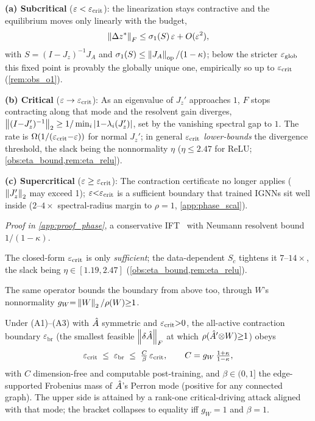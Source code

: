 \begin{theorem}
\noindent\textbf{(a) Subcritical} ($\varepsilon<\varepsilon_{\mathrm{crit}}$): the linearization stays contractive and the equilibrium moves only linearly with the budget,
\begin{equation}
\left\|\Delta z^{*}\right\|_F \leq \sigma_1(S)\,\varepsilon + O(\varepsilon^2),
\label{eq:shift_bound}
\end{equation}
with $S=(I-J_z)^{-1}J_A$ and $\sigma_1(S)\le\left\|J_A\right\|_{\mathrm{op}}/(1-\kappa)$; below the stricter $\varepsilon_{\mathrm{glob}}$ this fixed point is provably the globally unique one, empirically so up to $\varepsilon_{\mathrm{crit}}$ (\cref{rem:obs_o1}).

\noindent\textbf{(b) Critical} ($\varepsilon \to \varepsilon_{\mathrm{crit}}$): As an eigenvalue of $J_z'$ approaches $1$, $F$ stops contracting along that mode and the resolvent gain diverges, $\left\|(I{-}J_z')^{-1}\right\|_2 \geq 1/\min_i|1{-}\lambda_i(J_z')|$, set by the vanishing spectral gap to $1$. The rate is $\Omega(1/(\varepsilon_{\mathrm{crit}}{-}\varepsilon))$ for normal $J_z'$; in general $\varepsilon_{\mathrm{crit}}$ \emph{lower-bounds} the divergence threshold, the slack being the nonnormality $\eta$ ($\eta{\leq}2.47$ for ReLU; \cref{obs:eta_bound,rem:eta_relu}).

\noindent\textbf{(c) Supercritical} ($\varepsilon \geq \varepsilon_{\mathrm{crit}}$): The contraction certificate no longer applies ($\left\|J_z'\right\|_2$ may exceed 1); $\varepsilon{<}\varepsilon_{\mathrm{crit}}$ is a sufficient boundary that trained IGNNs sit well inside ($2$--$4\times$ spectral-radius margin to $\rho{=}1$, \cref{app:phase_scal}).
\end{theorem}

\noindent\textit{Proof in \cref{app:proof_phase}}, a conservative IFT~\cite{bolte2021conservative} with Neumann resolvent bound $1/(1{-}\kappa)$.

The closed-form $\varepsilon_{\mathrm{crit}}$ is only \emph{sufficient}; the data-dependent $S_c$ tightens it $7$--$14\times$, the slack being $\eta\in[1.19,2.47]$ (\cref{obs:eta_bound,rem:eta_relu}).

The same operator bounds the boundary from above too, through $W$'s nonnormality $g_W{=}\left\|W\right\|_2/\rho(W){\geq}1$.

\begin{theorem}
\label{thm:cf2s}
Under \textnormal{(A1)--(A3)} with $\hat{A}$ symmetric and $\varepsilon_{\mathrm{crit}}{>}0$, the all-active contraction boundary $\varepsilon_{\mathrm{br}}$ (the smallest feasible $\left\|\delta\hat{A}\right\|_F$ at which $\rho(\hat{A}'{\otimes}W){\geq}1$) obeys
\begin{equation}
\varepsilon_{\mathrm{crit}} \;\leq\; \varepsilon_{\mathrm{br}} \;\leq\; \tfrac{C}{\beta}\,\varepsilon_{\mathrm{crit}},
\qquad C = g_W\,\tfrac{1+\kappa}{1-\kappa},
\label{eq:bracket}
\end{equation}
with $C$ dimension-free and computable post-training, and $\beta{\in}(0,1]$ the edge-supported Frobenius mass of $\hat{A}$'s Perron mode (positive for any connected graph). The upper side is attained by a rank-one critical-driving attack aligned with that mode; the bracket collapses to equality iff $g_W{=}1$ and $\beta{=}1$.
\end{theorem}

